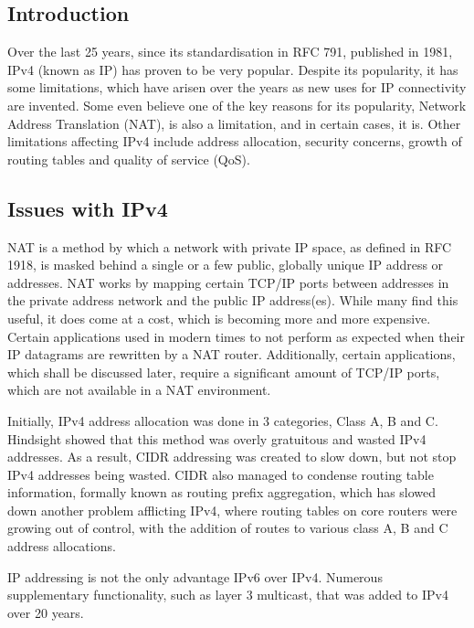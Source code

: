 
\subsection{Introduction}

Over the last 25 years, since its standardisation in RFC 791, published
in 1981, IPv4 (known as IP) has proven to be very popular. Despite its 
popularity, it has some limitations, which have arisen over the years 
as new uses for IP connectivity are invented. Some even believe one of 
the key reasons for its popularity, Network Address Translation (NAT), 
is also a limitation, and in certain cases, it is. Other limitations
affecting IPv4 include address allocation, security concerns, growth of 
routing tables and quality of service (QoS).

\subsection{Issues with IPv4}

NAT is a method by which a network with private IP space, as defined in
RFC 1918, is masked behind a single or a few public, globally unique IP
address or addresses. NAT works by mapping certain TCP/IP ports between
addresses in the private address network and the public IP address(es).
While many find this useful, it does come at a cost, which is becoming
more and more expensive. Certain applications used in modern times to
not perform as expected when their IP datagrams are rewritten by a NAT
router. Additionally, certain applications, which shall be discussed
later, require a significant amount of TCP/IP ports, which are not
available in a NAT environment.


Initially, IPv4 address allocation was done in 3 categories, Class A, B
and C. Hindsight showed that this method was overly gratuitous and
wasted IPv4 addresses. As a result, CIDR addressing was created to slow 
down, but not stop IPv4 addresses being wasted. CIDR also managed to condense 
routing table information, formally known as routing prefix aggregation, 
which has slowed down another problem afflicting IPv4, where routing tables 
on core routers were growing out of control, with the addition of routes to
various class A, B and C address allocations.


IP addressing is not the only advantage IPv6 over IPv4. Numerous
supplementary functionality, such as layer 3 multicast, that was added to IPv4 over 20 years.

